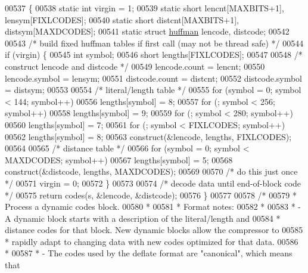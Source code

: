 \begin{DoxyCode}
00537 \{
00538     \textcolor{keyword}{static} \textcolor{keywordtype}{int} virgin = 1;
00539     \textcolor{keyword}{static} \textcolor{keywordtype}{short} lencnt[MAXBITS+1], lensym[FIXLCODES];
00540     \textcolor{keyword}{static} \textcolor{keywordtype}{short} distcnt[MAXBITS+1], distsym[MAXDCODES];
00541     \textcolor{keyword}{static} \textcolor{keyword}{struct }\hyperlink{structhuffman}{huffman} lencode, distcode;
00542 
00543     \textcolor{comment}{/* build fixed huffman tables if first call (may not be thread safe) */}
00544     \textcolor{keywordflow}{if} (virgin) \{
00545         \textcolor{keywordtype}{int} symbol;
00546         \textcolor{keywordtype}{short} lengths[FIXLCODES];
00547 
00548         \textcolor{comment}{/* construct lencode and distcode */}
00549         lencode.count = lencnt;
00550         lencode.symbol = lensym;
00551         distcode.count = distcnt;
00552         distcode.symbol = distsym;
00553 
00554         \textcolor{comment}{/* literal/length table */}
00555         \textcolor{keywordflow}{for} (symbol = 0; symbol < 144; symbol++)
00556             lengths[symbol] = 8;
00557         \textcolor{keywordflow}{for} (; symbol < 256; symbol++)
00558             lengths[symbol] = 9;
00559         \textcolor{keywordflow}{for} (; symbol < 280; symbol++)
00560             lengths[symbol] = 7;
00561         \textcolor{keywordflow}{for} (; symbol < FIXLCODES; symbol++)
00562             lengths[symbol] = 8;
00563         construct(&lencode, lengths, FIXLCODES);
00564 
00565         \textcolor{comment}{/* distance table */}
00566         \textcolor{keywordflow}{for} (symbol = 0; symbol < MAXDCODES; symbol++)
00567             lengths[symbol] = 5;
00568         construct(&distcode, lengths, MAXDCODES);
00569 
00570         \textcolor{comment}{/* do this just once */}
00571         virgin = 0;
00572     \}
00573 
00574     \textcolor{comment}{/* decode data until end-of-block code */}
00575     \textcolor{keywordflow}{return} codes(s, &lencode, &distcode);
00576 \}
00577 
00578 \textcolor{comment}{/*}
00579 \textcolor{comment}{ * Process a dynamic codes block.}
00580 \textcolor{comment}{ *}
00581 \textcolor{comment}{ * Format notes:}
00582 \textcolor{comment}{ *}
00583 \textcolor{comment}{ * - A dynamic block starts with a description of the literal/length and}
00584 \textcolor{comment}{ *   distance codes for that block.  New dynamic blocks allow the compressor to}
00585 \textcolor{comment}{ *   rapidly adapt to changing data with new codes optimized for that data.}
00586 \textcolor{comment}{ *}
00587 \textcolor{comment}{ * - The codes used by the deflate format are "canonical", which means that}

\end{DoxyCode}
